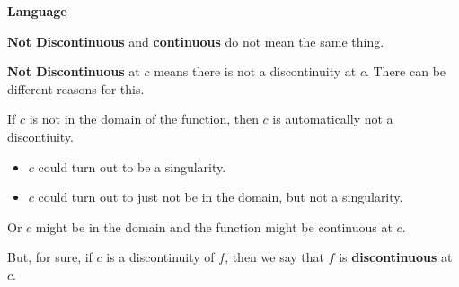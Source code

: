 \documentclass{ximera}
\begin{document}
\begin{idea} \textbf{\textcolor{blue!55!black}{Language}}  


\textbf{Not Discontinuous} and \textbf{continuous} do not mean the same thing. 

\textbf{Not Discontinuous} at $c$ means there is not a discontinuity at $c$.  There can be different reasons for this. 

If $c$ is not in the domain of the function, then $c$ is automatically not a discontiuity.  
\begin{itemize}
     \item $c$ could turn out to be a singularity.  
     \item $c$ could turn out to just not be in the domain, but not a singularity.
\end{itemize}

Or $c$ might be in the domain and the function might be continuous at $c$.

\end{idea}





But, for sure, if $c$ is a discontinuity of $f$, then we say that $f$ is \textbf{discontinuous} at $c$.
\end{document}
